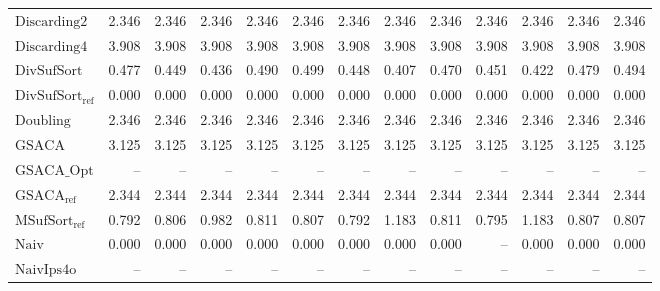 \begin{table}[ht]
{\begin{tabular}{lrrrrrrrrrrrr}
    $\text{Discarding2}$ & 2.346 & 2.346 & 2.346 & 2.346 & 2.346 & 2.346 & 2.346 & 2.346 & 2.346 & 2.346 & 2.346 & 2.346 \\
    $\text{Discarding4}$ & {\color{red}3.908} & {\color{red}3.908} & {\color{red}3.908} & {\color{red}3.908} & {\color{red}3.908} & {\color{red}3.908} & {\color{red}3.908} & {\color{red}3.908} & {\color{red}3.908} & {\color{red}3.908} & {\color{red}3.908} & {\color{red}3.908} \\
    $\text{DivSufSort}$ & 0.477 & 0.449 & 0.436 & 0.490 & 0.499 & 0.448 & 0.407 & 0.470 & 0.451 & 0.422 & 0.479 & 0.494 \\
    $\text{DivSufSort}_{\text{ref}}$ & {\color{green!60!black}0.000} & 0.000 & 0.000 & {\color{green!60!black}0.000} & {\color{green!60!black}0.000} & {\color{green!60!black}0.000} & {\color{green!60!black}0.000} & {\color{green!60!black}0.000} & {\color{green!60!black}0.000} & {\color{green!60!black}0.000} & {\color{green!60!black}0.000} & {\color{green!60!black}0.000} \\
    $\text{Doubling}$ & 2.346 & 2.346 & 2.346 & 2.346 & 2.346 & 2.346 & 2.346 & 2.346 & 2.346 & 2.346 & 2.346 & 2.346 \\
    $\text{GSACA}$ & 3.125 & 3.125 & 3.125 & 3.125 & 3.125 & 3.125 & 3.125 & 3.125 & 3.125 & 3.125 & 3.125 & 3.125 \\
    $\text{GSACA\_Opt}$ & {\color{darkgray}--} & {\color{darkgray}--} & {\color{darkgray}--} & {\color{darkgray}--} & {\color{darkgray}--} & {\color{darkgray}--} & {\color{darkgray}--} & {\color{darkgray}--} & {\color{darkgray}--} & {\color{darkgray}--} & {\color{darkgray}--} & {\color{darkgray}--} \\
    $\text{GSACA}_{\text{ref}}$ & 2.344 & 2.344 & 2.344 & 2.344 & 2.344 & 2.344 & 2.344 & 2.344 & 2.344 & 2.344 & 2.344 & 2.344 \\
    $\text{MSufSort}_{\text{ref}}$ & 0.792 & 0.806 & 0.982 & 0.811 & 0.807 & 0.792 & 1.183 & 0.811 & 0.795 & 1.183 & 0.807 & 0.807 \\
    $\text{Naiv}$ & {\color{green!60!black}0.000} & {\color{green!60!black}0.000} & {\color{green!60!black}0.000} & {\color{green!60!black}0.000} & {\color{green!60!black}0.000} & {\color{green!60!black}0.000} & {\color{green!60!black}0.000} & {\color{green!60!black}0.000} & {\color{darkgray}--} & {\color{green!60!black}0.000} & {\color{green!60!black}0.000} & {\color{green!60!black}0.000} \\
    $\text{NaivIps4o}$ & {\color{darkgray}--} & {\color{darkgray}--} & {\color{darkgray}--} & {\color{darkgray}--} & {\color{darkgray}--} & {\color{darkgray}--} & {\color{darkgray}--} & {\color{darkgray}--} & {\color{darkgray}--} & {\color{darkgray}--} & {\color{darkgray}--} & {\color{darkgray}--} \\

\end{tabular}}
\end{table}
